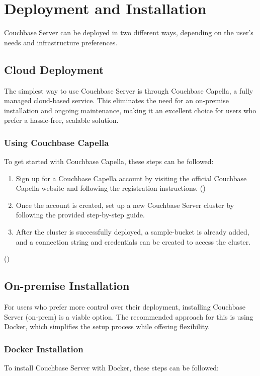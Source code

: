 \newpage
\chapter{Deployment and Installation}

Couchbase Server can be deployed in two different ways, depending on the user's needs and infrastructure preferences.

\section{Cloud Deployment}
The simplest way to use Couchbase Server is through Couchbase Capella, a fully managed cloud-based service. This eliminates the need for an on-premise installation and ongoing maintenance, making it an excellent choice for users who prefer a hassle-free, scalable solution.

\subsection{Using Couchbase Capella}
To get started with Couchbase Capella, these steps can be followed:

\begin{enumerate}
  \item Sign up for a Couchbase Capella account by visiting the official Couchbase Capella website and following the registration instructions. (\cite{couchbaseCapellaSignUp})
  \item Once the account is created, set up a new Couchbase Server cluster by following the provided step-by-step guide.
  \item After the cluster is successfully deployed, a sample-bucket is already added, and a connection string and credentials can be created to access the cluster.
\end{enumerate}
(\cite{couchbaseCapellaGettingStarted})

\section{On-premise Installation}
For users who prefer more control over their deployment, installing Couchbase Server (on-prem) is a viable option. The recommended approach for this is using Docker, which simplifies the setup process while offering flexibility.

\subsection{Docker Installation}
To install Couchbase Server with Docker, these steps can be followed:


